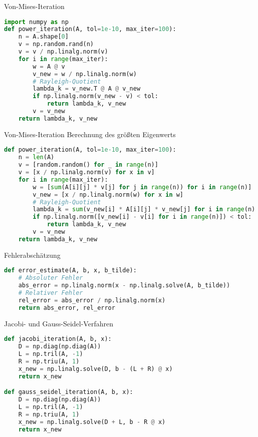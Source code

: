 \begin{examplecode}{Von-Mises-Iteration}
\begin{lstlisting}[language=Python, style=basesmol]
import numpy as np
def power_iteration(A, tol=1e-10, max_iter=100):
    n = A.shape[0]
    v = np.random.rand(n)
    v = v / np.linalg.norm(v)
    for i in range(max_iter):
        w = A @ v
        v_new = w / np.linalg.norm(w)
        # Rayleigh-Quotient
        lambda_k = v_new.T @ A @ v_new
        if np.linalg.norm(v_new - v) < tol:
            return lambda_k, v_new
        v = v_new
    return lambda_k, v_new
\end{lstlisting}
\end{examplecode}

\begin{examplecode}{Von-Mises-Iteration} Berechnung des größten Eigenwerts
\begin{lstlisting}[language=Python, style=basesmol]
def power_iteration(A, tol=1e-10, max_iter=100):
    n = len(A)
    v = [random.random() for _ in range(n)]
    v = [x / np.linalg.norm(v) for x in v]
    for i in range(max_iter):
        w = [sum(A[i][j] * v[j] for j in range(n)) for i in range(n)]
        v_new = [x / np.linalg.norm(w) for x in w]
        # Rayleigh-Quotient
        lambda_k = sum(v_new[i] * A[i][j] * v_new[j] for i in range(n) for j in range(n))
        if np.linalg.norm([v_new[i] - v[i] for i in range(n)]) < tol:
            return lambda_k, v_new
        v = v_new
    return lambda_k, v_new
\end{lstlisting}
\end{examplecode}

\begin{examplecode}{Fehlerabschätzung}
\begin{lstlisting}[language=Python, style=basesmol]
def error_estimate(A, b, x, b_tilde):
    # Absoluter Fehler
    abs_error = np.linalg.norm(x - np.linalg.solve(A, b_tilde))
    # Relativer Fehler
    rel_error = abs_error / np.linalg.norm(x)
    return abs_error, rel_error
\end{lstlisting}
\end{examplecode}

\begin{examplecode}{Jacobi- und Gauss-Seidel-Verfahren}
\begin{lstlisting}[language=Python, style=basesmol]
def jacobi_iteration(A, b, x):
    D = np.diag(np.diag(A))
    L = np.tril(A, -1)
    R = np.triu(A, 1)
    x_new = np.linalg.solve(D, b - (L + R) @ x)
    return x_new

def gauss_seidel_iteration(A, b, x):
    D = np.diag(np.diag(A))
    L = np.tril(A, -1)
    R = np.triu(A, 1)
    x_new = np.linalg.solve(D + L, b - R @ x)
    return x_new
\end{lstlisting}
\end{examplecode}


